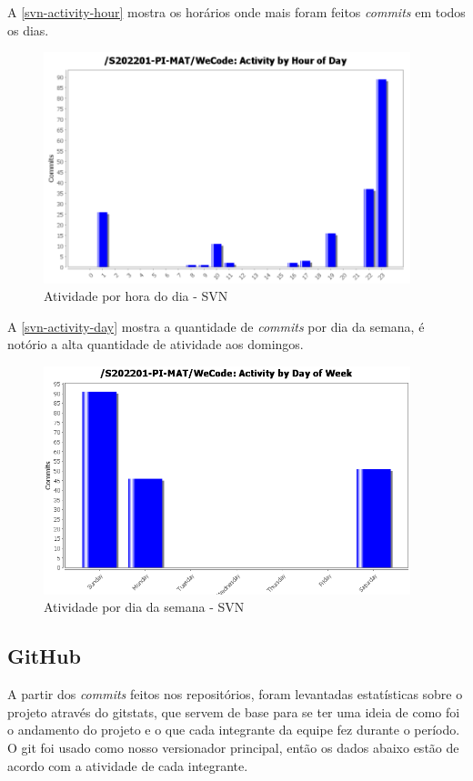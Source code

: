 A \autoref{svn-activity-hour} mostra os horários onde mais foram feitos \textit{commits} em todos os dias.
\begin{figure}[H]
	\centering
	\caption{\label{svn-activity-hour}Atividade por hora do dia - SVN}
	\includegraphics[width=0.95\textwidth]{../imagens/stats/svn-activity-hour.png}
\end{figure}

A \autoref{svn-activity-day} mostra a quantidade de \textit{commits} por dia da semana, é notório a alta quantidade de atividade aos domingos.
\begin{figure}[H]
	\centering
	\caption{\label{svn-activity-day}Atividade por dia da semana - SVN}
	\includegraphics[width=0.95\textwidth]{../imagens/stats/svn-activity-day.png}
\end{figure}

\subsection{GitHub}
A partir dos \textit{commits} feitos nos repositórios, foram levantadas estatísticas sobre o projeto através do \gls{gitstats}, que servem de base para se ter uma ideia de como foi o andamento do projeto e o que cada integrante da equipe fez durante o período.
O \gls{git} foi usado como nosso versionador principal, então os dados abaixo estão de acordo com a atividade de cada integrante.

